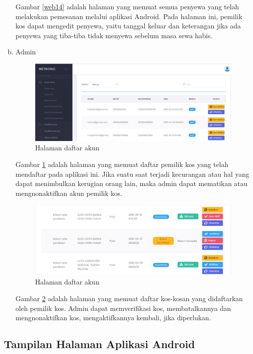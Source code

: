 \begin{enumerate}[a.]
		Gambar \ref{web14} adalah halaman yang memuat semua penyewa yang telah melakukan pemesanan melalui aplikasi Android. Pada halaman ini, pemilik kos dapat mengedit penyewa, yaitu tanggal keluar dan keterangan jika ada penyewa yang tiba-tiba tidak menyewa sebelum masa sewa habis.
		
		\item Admin
		\begin{figure}[H]
			\centering
			\includegraphics[width=\textwidth]{gambar/a1}
			\caption{Halaman daftar akun}
			\label{webA1}
		\end{figure}
	
	Gambar \ref{webA1} adalah halaman yang memuat daftar pemilik kos yang telah mendaftar pada aplikasi ini. Jika suatu saat terjadi kecurangan atau hal yang dapat menimbulkan kerugian orang lain, maka admin dapat mematikan atau mengnonaktifkan akun pemilik kos.
	
	\begin{figure}[H]
		\centering
		\includegraphics[width=\textwidth]{gambar/a2}
		\caption{Halaman daftar akun}
		\label{webA2}
	\end{figure}
	
	Gambar \ref{webA2} adalah halaman yang memuat daftar kos-kosan yang didaftarkan oleh pemilik kos. Admin dapat memverifikasi kos, membatalkannya dan mengnonaktifkan kos, mengaktifkannya kembali, jika diperlukan.
	\end{enumerate}

		\subsection{Tampilan Halaman Aplikasi Android}
		
